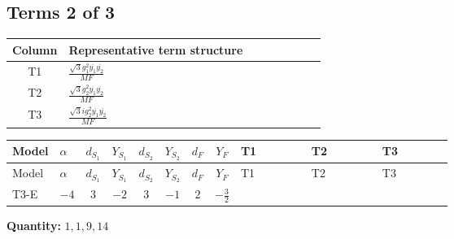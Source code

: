 \documentclass[8pt]{article}
\begin{document}
\begin{landscape}
\subsection*{Terms 2 of 3}
\begin{center}
\begin{tabular}{@{}c >{\raggedright\arraybackslash}p{0.82\linewidth}@{}}
\toprule
Column & Representative term structure \\
\midrule
T1 & \(\displaystyle \frac{\sqrt{3} g_{1}^{2} \overline{y_{1}} \overline{y_{2}}}{MF}\) \\
\midrule
T2 & \(\displaystyle \frac{\sqrt{3} g_{2}^{2} \overline{y_{1}} \overline{y_{2}}}{MF}\) \\
\midrule
T3 & \(\displaystyle \frac{\sqrt{3} i g_{2}^{2} \overline{y_{1}} \overline{y_{2}}}{MF}\) \\
\midrule
\bottomrule
\end{tabular}
\end{center}
\smallskip
\tiny
\begin{longtable}{@{}llcccccc >{\raggedright\arraybackslash}p{0.21\linewidth} >{\raggedright\arraybackslash}p{0.21\linewidth} >{\raggedright\arraybackslash}p{0.21\linewidth}@{}}
\toprule
Model & $\alpha$ & $d_{S_1}$ & $Y_{S_1}$ & $d_{S_2}$ & $Y_{S_2}$ & $d_F$ & $Y_F$ & T1 & T2 & T3 \\
\midrule
\endfirsthead
\toprule
Model & $\alpha$ & $d_{S_1}$ & $Y_{S_1}$ & $d_{S_2}$ & $Y_{S_2}$ & $d_F$ & $Y_F$ & T1 & T2 & T3 \\
\midrule
\endhead
T3-E & $-4$ & $3$ & $-2$ & $3$ & $-1$ & $2$ & $-\frac{3}{2}$ & \scriptsize\adjustbox{max width=\linewidth}{$\begin{gathered} \frac{9 \sqrt{3} g_{1}^{2} \overline{y_{1}} \overline{y_{2}}}{8 MF}\end{gathered}$} & \scriptsize\adjustbox{max width=\linewidth}{$\begin{gathered} \frac{49 \sqrt{3} g_{2}^{2} \overline{y_{1}} \overline{y_{2}}}{24 MF}\end{gathered}$} & \scriptsize\adjustbox{max width=\linewidth}{$\begin{gathered} - \frac{\sqrt{3} i g_{2}^{2} \overline{y_{1}} \overline{y_{2}}}{6 MF}\end{gathered}$} \\
\midrule
\bottomrule
\end{longtable}
\clearpage
\noindent\textbf{Quantity: }$\mathrm{1,1,9,14}$\par\smallskip

\end{landscape}
\end{document}
